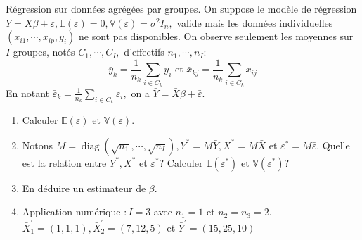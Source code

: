 \documentclass{td_um}
\providecommand{\1}{\mathds{1}}
\begin{document}
\exo{} Régression sur données agrégées par groupes. On suppose le modèle de régression $Y=X \beta+\varepsilon, \mathbb{E}(\varepsilon)=0, \mathbb{V}(\varepsilon)=\sigma^{2} I_{n},$ valide
mais les données individuelles $\left(x_{i 1}, \cdots, x_{i p}, y_{i}\right)$ ne sont pas disponibles. On observe seulement les moyennes sur $I$ groupes, notés $C_{1}, \cdots, C_{I},$ d'effectifs $n_{1}, \cdots, n_{I}:$
$$
\bar{y}_{k}=\frac{1}{n_{k}} \sum_{i \in C_{k}} y_{i} \text { et } \bar{x}_{k j}=\frac{1}{n_{k}} \sum_{i \in C_{k}} x_{i j}
$$
En notant $\bar{\varepsilon}_{k}=\frac{1}{n_{k}} \sum_{i \in C_{k}} \varepsilon_{i},$ on a $\bar{Y}=\bar{X} \beta+\bar{\varepsilon} .$
\begin{enumerate}
    \item  Calculer $\mathbb{E}(\bar{\varepsilon})$ et $\mathbb{V}(\bar{\varepsilon})$.
    \item  Notons $M=\operatorname{diag}\left(\sqrt{n_{1}}, \cdots, \sqrt{n_{I}}\right), Y^{*}=M \bar{Y}, X^{*}=M \bar{X}$ et $\varepsilon^{*}=M \bar{\varepsilon}$. Quelle est la relation entre $Y^{*}, X^{*}$ et $\varepsilon^{*} ?$ Calculer $\mathbb{E}\left(\varepsilon^{*}\right)$ et $\mathbb{V}\left(\varepsilon^{*}\right) ?$
    \item  En déduire un estimateur de $\beta$.
    \item  Application numérique $: I=3$ avec $n_{1}=1$ et $n_{2}=n_{3}=2$. $\bar{X}_{1}^{\prime}=(1,1,1), \bar{X}_{2}^{\prime}=(7,12,5)$ et $\bar{Y}^{\prime}=(15,25,10)$
\end{enumerate}
\end{document}
